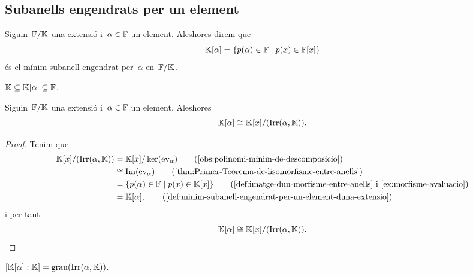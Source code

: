 \documentclass[../../main.tex]{subfiles}
\begin{document}
\subsection{Subanells engendrats per un element}
    \begin{definition}
        \label{def:minim-subanell-engendrat-per-un-element-duna-extensio}
        Siguin~\(\mathbb{F}/\mathbb{K}\) una extensió i~\(\alpha\in\mathbb{F}\) un element.
        Aleshores direm que
        \[
            \mathbb{K}[\alpha]=\{p(\alpha)\in\mathbb{F}\mid p(x)\in\mathbb{F}[x]\}
        \]
        és el mínim subanell engendrat per~\(\alpha\) en~\(\mathbb{F}/\mathbb{K}\).
    \end{definition}
    \begin{observation}
    \label{obs:lanell-engendrat-per-alpha-esta-entre-lextensio}
        \(\mathbb{K}\subseteq\mathbb{K}[\alpha]\subseteq\mathbb{F}\).
    \end{observation}
    \begin{proposition}
        \label{prop:el-minim-subanell-engendrat-per-un-element-es-lanell-de-polinomis-quocient-lirreductible-de-lelement}
        Siguin~\(\mathbb{F}/\mathbb{K}\) una extensió i~\(\alpha\in\mathbb{F}\) un element.
        Aleshores
        \[
            \mathbb{K}[\alpha]\cong\mathbb{K}[x]/(\operatorname{Irr}(\alpha,\mathbb{K})).
        \]
    \end{proposition}
    \begin{proof}
        Tenim que
        \begin{align*}
            \KK[x]/(\Irr(\alpha,\KK))&=\KK[x]/\ker(\ev_{\alpha}) \tag{\ref{obs:polinomi-minim-de-descomposicio}}\\
            &\cong\Ima(\ev_{\alpha}) \tag{\ref{thm:Primer-Teorema-de-lisomorfisme-entre-anells}}\\
            &=\{p(\alpha)\in\FF\mid p(x)\in\KK[x]\} \tag{\ref{def:imatge-dun-morfisme-entre-anells} i \ref{ex:morfisme-avaluacio}}\\
            &= \KK[\alpha], \tag{\ref{def:minim-subanell-engendrat-per-un-element-duna-extensio}}
        \end{align*}
        i per tant
        \[
            \mathbb{K}[\alpha]\cong\mathbb{K}[x]/(\operatorname{Irr}(\alpha,\mathbb{K})).\qedhere
        \]
    \end{proof}
    \begin{corollary}
        \label{cor:grau-dun-minim-subanell-engendrat-per-un-element-duna-extensio}
        \([\mathbb{K}[\alpha]:\mathbb{K}]=\operatorname{grau}(\operatorname{Irr}(\alpha,\mathbb{K}))\).
    \end{corollary}
\end{document}
